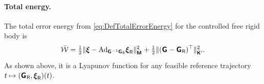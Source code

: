 \paragraph{Total energy.}
The total error energy from \eqref{eq:DefTotalErrorEnergy} for the controlled free rigid body is
\begin{align}
 \totalEnergyC = \tfrac{1}{2} \norm[\bodyInertiaMatC{}{}]{\sysVel - \Ad{\bodyHomoCoord{}{}^{-1}\bodyHomoCoordR{}{}} \sysVelR}^2 + \tfrac{1}{2} \norm[\bodyStiffMatCp{}{}]{ (\bodyHomoCoord{}{} - \bodyHomoCoordR{}{} )^\top}^2
 .
\end{align}
As shown above, it is a Lyapunov function for any feasible reference trajectory $t\mapsto (\bodyHomoCoordR{}{}, \sysVelR)(t)$.

